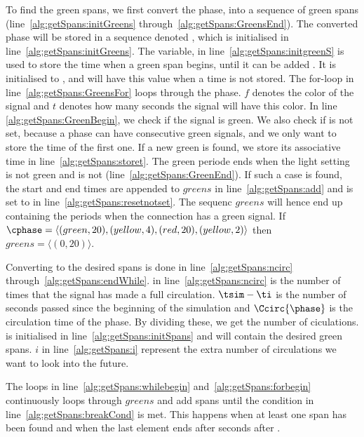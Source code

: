 To find the green spans, we first convert the phase, \phase into a sequence of green spans (line~\ref{alg:getSpans:initGreens} through~\ref{alg:getSpans:GreensEnd}).
The converted phase will be stored in a sequence denoted \greens, which is initialised in line~\ref{alg:getSpans:initGreens}.
The variable, \greenStart in line~\ref{alg:getSpans:initgreenS} is used to store the time when a green span begins, until it can be added \greens. 
It is initialised to \notset, and will have this value when a time is not stored.
The for-loop in line~\ref{alg:getSpans:GreensFor} loops through the phase.
$f$ denotes the color of the signal and $t$ denotes how many seconds the signal will have this color.
In line \ref{alg:getSpans:GreenBegin}, we check if the signal is green. 
We also check if \greenStart is not set, because a phase can have consecutive green signals, and we only want to store the time of the first one.
If a new green is found, we store its associative time in line~\ref{alg:getSpans:storet}.
The green periode ends when the light setting is not green and \greenStart is not \notset (line~\ref{alg:getSpans:GreenEnd}).
If such a case is found, the start and end times are appended to $greens$ in line~\ref{alg:getSpans:add} and \greenStart is set to \notset in line~\ref{alg:getSpans:resetnotset}.
The sequenc $greens$ will hence end up containing the periods when the connection has a green signal.
If $\cphase=\langle (green, 20), (yellow, 4), (red, 20), (yellow, 2)\rangle$ then $greens=\langle (0,20)\rangle$.

Converting \greens to the desired spans is done in line~\ref{alg:getSpans:ncirc} through~\ref{alg:getSpans:endWhile}.
\ncirc in line~\ref{alg:getSpans:ncirc} is the number of times that the signal has made a full circulation.%
$\tsim-\ti$ is the number of seconds passed since the beginning of the simulation and $\Ccirc{\phase}$ is the circulation time of the phase. 
By dividing these, we get the number of ciculations.
\spans is initialised in line~\ref{alg:getSpans:initSpans} and will contain the desired green spans.
$i$ in line~\ref{alg:getSpans:i} represent the extra number of circulations we want to look into the future.

The loops in line~\ref{alg:getSpans:whilebegin} and~\ref{alg:getSpans:forbegin} continuously loops through $greens$ and add spans until the condition in line~\ref{alg:getSpans:breakCond} is met.
This happens when at least one span has been found and when the last element ends after \tmax seconds after \ti.

